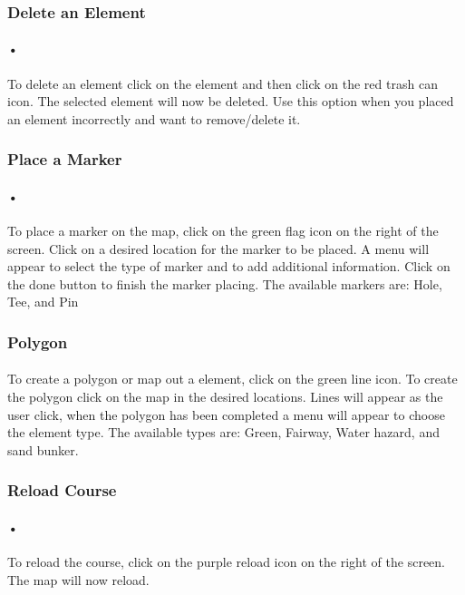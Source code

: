 \documentclass{article}
\begin{document}
    \subsubsection{Delete an Element}
    \paragraph{•}
    To delete an element click on the element and then click on the red trash can icon. The selected element will now be deleted. Use this option when you placed an element incorrectly and want to remove/delete it.
    
    \subsubsection{Place a Marker}
	\paragraph{•}
	To place a marker on the map, click on the green flag icon on the right of the screen. Click on a desired location for the marker to be placed. A menu will appear to select the type of marker and to add additional information. Click on the done button to finish the marker placing. The available markers are: Hole, Tee, and Pin
	
	\subsubsection{Polygon}
    \paragraph{}
    To create a polygon or map out a element, click on the green line icon. To create the polygon click on the map in the desired locations. Lines will appear as the user click, when the polygon has been completed a menu will appear to choose the element type. The available types are: Green, Fairway, Water hazard, and sand bunker.
    
	\subsubsection{Reload Course}    
	\paragraph{•}
	To reload the course, click on the purple reload icon on the right of the screen. The map will now reload.
	
\end{document}
